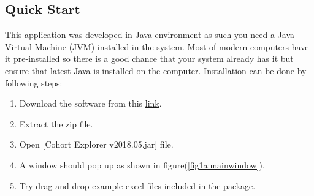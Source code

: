 \documentclass{article}
\begin{document}
\subsection{Quick Start}
This application was developed in Java environment as such you need a Java Virtual Machine (JVM) installed in the system. Most of modern computers have it pre-installed so there is a good chance that your system already has it but ensure that latest Java is installed on the computer.
Installation can be done by following steps:
\begin{enumerate}
    \item Download the software from this  \href{https://www.dropbox.com/s/vomnpogmf91sim1/cohort_explorer_v2018.05.zip?dl=0}{link}.
    \item Extract the zip file.
    \item Open [Cohort Explorer v2018.05.jar] file.
    \item A window should pop up as shown in figure(\ref{fig1a:mainwindow}).
    \item Try drag and drop example excel files included in the package.
\end{enumerate}
\end{document}
